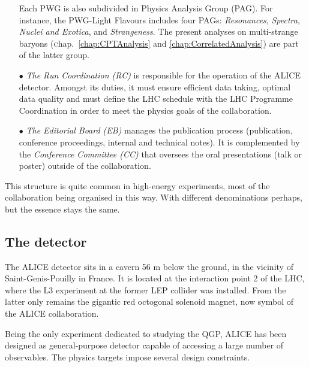\documentclass[ALICE,manyauthors]{cernphprep}
\newcommand{\chap}      {\textsc{c}hap.~}
\providecommand{\DIFaddtex}[1]{{\protect\color{blue}\uwave{#1}}} %
\providecommand{\DIFaddbegin}{} %
\providecommand{\DIFaddend}{} %
\providecommand{\DIFadd}[1]{\texorpdfstring{\DIFaddtex{#1}}{#1}} %
\newcommand{\DIFaddincludegraphics}[2][]{{\color{blue}\fbox{\DIFOincludegraphics[#1]{#2}}}} %
\DeclareRobustCommand{\DIFaddbegin}{\DIFOaddbegin \let\includegraphics\DIFaddincludegraphics} %
\DeclareRobustCommand{\DIFaddend}{\DIFOaddend \let\includegraphics\DIFOincludegraphics} %
\begin{document}
\begin{itemize}
Each PWG is also subdivided in Physics Analysis Group (PAG). For instance, the PWG-Light Flavours includes four PAGs: \textit{Resonances}, \textit{Spectra}, \textit{Nuclei and Exotica}, and \textit{Strangeness}. The present analyses on multi-strange baryons (\chap\ref{chap:CPTAnalysis} and \ref{chap:CorrelatedAnalysis}) are part of the latter group.

\item[$\bullet$] \textit{The Run Coordination (RC)} is responsible for the operation of the ALICE detector. Amongst its duties, it must ensure efficient data taking, optimal data quality and must define the LHC schedule with the LHC Programme Coordination in order to meet the physics goals of the collaboration.
\item[$\bullet$] \textit{The Editorial Board (EB)} manages the publication process (publication, conference proceedings, internal and technical notes). It is complemented by the \textit{Conference Committee (CC)} that oversees the oral presentations (talk or poster) outside of the collaboration.
\end{itemize}

This structure is quite common in high-energy experiments, most of the collaboration \DIFaddbegin \DIFadd{are }\DIFaddend being organised in this way. With different denominations perhaps, but the essence stays the same.

\subsection{The detector}
\label{subsec:ALICEDetector}

The ALICE detector sits in a cavern 56 m below the ground, in the vicinity of Saint-Genis-Pouilly in France. It is located at the interaction point 2 of the LHC, where the L3 experiment at the former LEP collider was installed. From the latter only remains the gigantic red octogonal solenoid magnet, now symbol of the ALICE collaboration.

Being the only experiment dedicated to studying the QGP, ALICE has been designed as general-purpose detector capable of accessing a large number of observables. The physics targets impose several design constraints.
\end{document}
